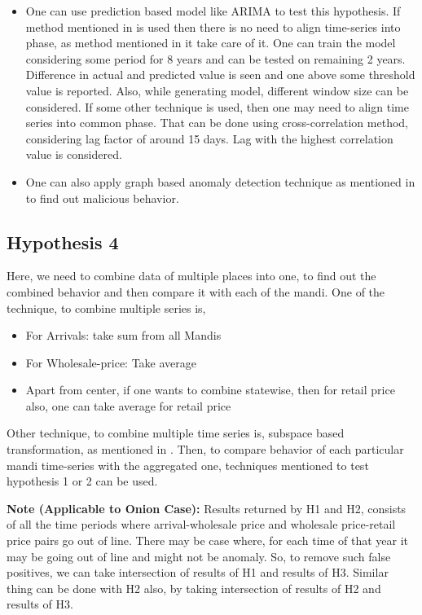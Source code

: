 \begin{itemize}

\item One can use prediction based model like ARIMA \cite{arima} to test this hypothesis. If method mentioned in \cite{arima} is used then there is no need to align time-series into phase, as method mentioned in it take care of it. One can train the model considering some period for 8 years and can be tested on remaining 2 years. Difference in actual and predicted value is seen and one above some threshold value is reported. Also, while generating model, different window size can be considered. If some other technique is used, then one may need to align time series into common phase. That can be done using cross-correlation method, considering lag factor of around 15 days. Lag with the highest correlation value is considered.

\item One can also apply graph based anomaly detection technique as mentioned in \cite{nasa} to find out malicious behavior.

\end{itemize}

\subsection{Hypothesis 4}


Here, we need to combine data of multiple places into one, to find out the combined behavior and then compare it with each of the mandi. One of the technique, to combine multiple series is,

\begin{itemize}

\item For Arrivals: take sum from all Mandis
\item For Wholesale-price: Take average
\item Apart from center, if one wants to combine statewise, then for retail price also, one can take average for retail price

\end{itemize}

Other technique, to combine multiple time series is, subspace based transformation, as mentioned in \cite{phdthesisdc}. Then, to compare behavior of each particular mandi time-series with the aggregated one, techniques mentioned to test hypothesis 1 or 2 can be used.

\textbf{Note (Applicable to Onion Case):} Results returned by H1 and H2, consists of all the time periods where arrival-wholesale price and wholesale price-retail price pairs go out of line. There may be case where, for each time of that year it may be going out of line and might not be anomaly. So, to remove such false positives, we can take intersection of results of H1 and results of H3. Similar thing can be done with H2 also, by taking  intersection of results of H2 and results of H3.


